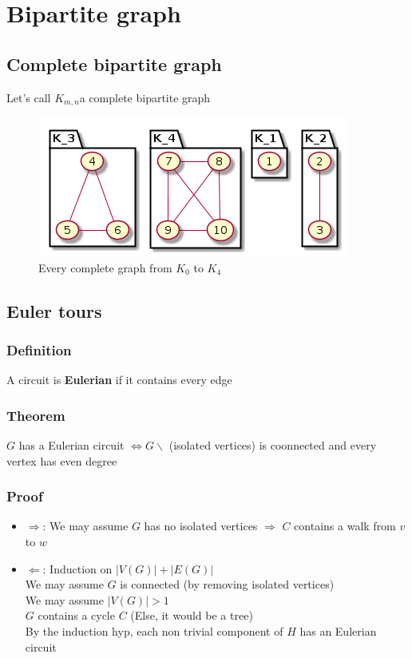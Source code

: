 \chapter{Bipartite graph}
    \section{Complete bipartite graph}
        Let's call $K_{m,n}$a complete bipartite graph
        \begin{figure}[h]%
            \centering
            \includegraphics[scale=0.5]{ressources/images/CompleteGraphs.png}
            \caption{Every complete graph from $K_0$ to $K_4$}
            \label{Complete graph}
        \end{figure}
    \section{Euler tours}
        \subsection{Definition}
            A circuit is \textbf{Eulerian} if it contains every edge
        \subsection{Theorem}
            $G$ has a Eulerian circuit $\Leftrightarrow G\backslash$ (isolated vertices) is coonnected and every vertex has even degree
        \subsection{Proof}
            \begin{itemize}
                \item $\Rightarrow$: We may assume $G$ has no isolated vertices $\Rightarrow$ $C$ contains a walk from $v$ to $w$
                \item $\Leftarrow$: Induction on $|V(G)|+|E(G)|$\\
                    We may assume $G$ is connected (by removing isolated vertices)\\
                    We may assume $|V(G)|>1$\\
                    $G$ contains a cycle $C$ (Else, it would be a tree)\\
                    By the induction hyp, each non trivial component of $H$ has an Eulerian circuit
            \end{itemize}

